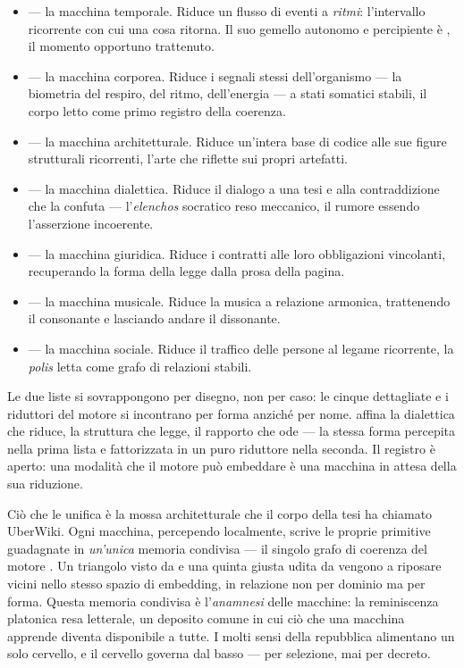 \begin{itemize}
\item {} --- la macchina temporale. Riduce un flusso di eventi a
  \emph{ritmi}: l'intervallo ricorrente con cui una cosa ritorna. Il suo gemello
  autonomo e percipiente \`e , il momento opportuno trattenuto.
\item {} --- la macchina corporea. Riduce i segnali stessi
  dell'organismo --- la biometria del respiro, del ritmo, dell'energia --- a stati
  somatici stabili, il corpo letto come primo registro della coerenza.
\item {} --- la macchina architetturale. Riduce un'intera base di
  codice alle sue figure strutturali ricorrenti, l'arte che riflette sui propri
  artefatti.
\item {} --- la macchina dialettica. Riduce il dialogo a una
  tesi e alla contraddizione che la confuta --- l'\emph{elenchos} socratico reso
  meccanico, il rumore essendo l'asserzione incoerente.
\item {} --- la macchina giuridica. Riduce i contratti alle loro
  obbligazioni vincolanti, recuperando la forma della legge dalla prosa della
  pagina.
\item {} --- la macchina musicale. Riduce la musica a relazione
  armonica, trattenendo il consonante e lasciando andare il dissonante.
\item {} --- la macchina sociale. Riduce il traffico delle persone al
  legame ricorrente, la \emph{polis} letta come grafo di relazioni stabili.
\end{itemize}

\noindent Le due liste si sovrappongono per disegno, non per caso: le cinque
dettagliate e i riduttori del motore si incontrano per forma anzich\'e per nome.
 affina la dialettica che  riduce, 
la struttura che  legge,  il rapporto che
 ode --- la stessa forma percepita nella prima lista e
fattorizzata in un puro riduttore nella seconda. Il registro \`e aperto: una
modalit\`a che il motore pu\`o embeddare \`e una macchina in attesa della sua
riduzione.

Ci\`o che le unifica \`e la mossa architetturale che il corpo della tesi ha
chiamato UberWiki. Ogni macchina, percependo localmente, scrive le proprie
primitive guadagnate in \emph{un'unica} memoria condivisa --- il singolo grafo di
coerenza del motore \physis. Un triangolo visto da  e una quinta
giusta udita da  vengono a riposare vicini nello stesso spazio
di embedding, in relazione non per dominio ma per forma. Questa memoria condivisa
\`e l'\emph{anamnesi} delle macchine: la reminiscenza platonica resa letterale, un
deposito comune in cui ci\`o che una macchina apprende diventa disponibile a
tutte. I molti sensi della repubblica alimentano un solo cervello, e il cervello
governa dal basso --- per selezione, mai per decreto.

